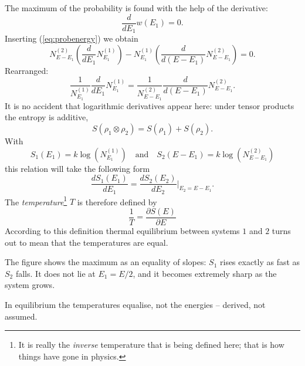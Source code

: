 The maximum of the probability is found with the help of the derivative:
\begin{equation}
	\frac{d}{dE_1} w(E_1) = 0.
\end{equation}
Inserting (\ref{eq:probenergy}) we obtain
\begin{equation}
	N_{E-E_1}^{(2)}\left(\frac{d}{dE_1}N_{E_1}^{(1)}\right) - N_{E_1}^{(1)}\left(\frac{d}{d(E-E_1)}N_{E-E_1}^{(2)}\right) = 0.
\end{equation}
Rearranged:
\begin{equation}
	\frac{1}{N_{E_1}^{(1)}}\frac{d}{dE_1}N_{E_1}^{(1)} =  \frac{1}{N_{E-E_1}^{(2)}}\frac{d}{d(E-E_1)}N_{E-E_1}^{(2)}.
\end{equation}
It is no accident that logarithmic derivatives appear here: under tensor products the entropy is additive,
\begin{equation}
	S(\rho_1\otimes \rho_2) = S(\rho_1)+S(\rho_2).
\end{equation}
With 
\begin{equation}
	S_1(E_1) = k\log(N_{E_1}^{(1)})\quad \text{and} \quad S_2(E-E_1) = k\log(N_{E-E_1}^{(2)})
\end{equation}
this relation will take the following form
\begin{equation}
	\frac{dS_1(E_1)}{dE_1} = \frac{dS_2(E_2)}{dE_2}\bigg|_{E_2 = E-E_1}.
\end{equation}
The \emph{temperature}\footnote{It is really the \emph{inverse} temperature that is being defined here; that is how things have gone in physics.} $T$ is therefore defined by 
\begin{equation}
	\frac{1}{T} = \frac{\partial S(E)}{\partial E}
\end{equation}
According to this definition thermal equilibrium between systems $1$ and $2$ turns out to mean that the temperatures are equal.



The figure shows the maximum as an equality of slopes: $S_1$ rises exactly as fast as $S_2$ falls. It does not lie at $E_1=E/2$, and it becomes extremely sharp as the system grows.

\begin{merksatz}
	In equilibrium the temperatures equalise, not the energies -- derived, not assumed.
\end{merksatz}

